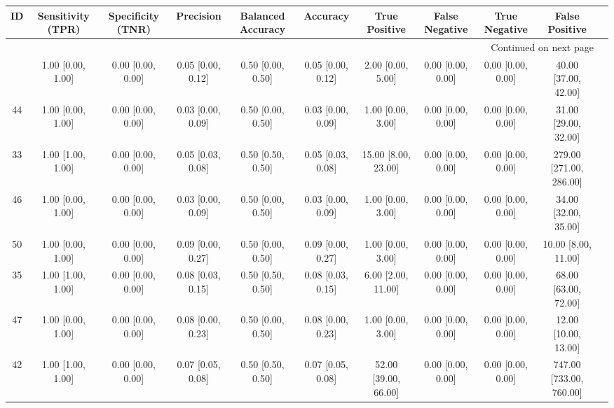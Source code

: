 \documentclass[8pt]{article}
\begin{document}
\begin{center}
\begin{footnotesize}
\begin{longtable}{|ccccccccccc|}
\toprule
 ID &  Sensitivity (TPR) &  Specificity (TNR) &          Precision &  Balanced Accuracy &           Accuracy &         True Positive &        False Negative &            True Negative &           False Positive \\
\midrule
\endhead
\midrule
\multicolumn{10}{r}{{Continued on next page}} \\
\midrule
\endfoot

\bottomrule
\endlastfoot
 45 &  1.00 [0.00, 1.00] &  0.00 [0.00, 0.00] &  0.05 [0.00, 0.12] &  0.50 [0.00, 0.50] &  0.05 [0.00, 0.12] &     2.00 [0.00, 5.00] &     0.00 [0.00, 0.00] &        0.00 [0.00, 0.00] &     40.00 [37.00, 42.00] \\
 44 &  1.00 [0.00, 1.00] &  0.00 [0.00, 0.00] &  0.03 [0.00, 0.09] &  0.50 [0.00, 0.50] &  0.03 [0.00, 0.09] &     1.00 [0.00, 3.00] &     0.00 [0.00, 0.00] &        0.00 [0.00, 0.00] &     31.00 [29.00, 32.00] \\
 33 &  1.00 [1.00, 1.00] &  0.00 [0.00, 0.00] &  0.05 [0.03, 0.08] &  0.50 [0.50, 0.50] &  0.05 [0.03, 0.08] &   15.00 [8.00, 23.00] &     0.00 [0.00, 0.00] &        0.00 [0.00, 0.00] &  279.00 [271.00, 286.00] \\
 46 &  1.00 [0.00, 1.00] &  0.00 [0.00, 0.00] &  0.03 [0.00, 0.09] &  0.50 [0.00, 0.50] &  0.03 [0.00, 0.09] &     1.00 [0.00, 3.00] &     0.00 [0.00, 0.00] &        0.00 [0.00, 0.00] &     34.00 [32.00, 35.00] \\
 50 &  1.00 [0.00, 1.00] &  0.00 [0.00, 0.00] &  0.09 [0.00, 0.27] &  0.50 [0.00, 0.50] &  0.09 [0.00, 0.27] &     1.00 [0.00, 3.00] &     0.00 [0.00, 0.00] &        0.00 [0.00, 0.00] &      10.00 [8.00, 11.00] \\
 35 &  1.00 [1.00, 1.00] &  0.00 [0.00, 0.00] &  0.08 [0.03, 0.15] &  0.50 [0.50, 0.50] &  0.08 [0.03, 0.15] &    6.00 [2.00, 11.00] &     0.00 [0.00, 0.00] &        0.00 [0.00, 0.00] &     68.00 [63.00, 72.00] \\
 47 &  1.00 [0.00, 1.00] &  0.00 [0.00, 0.00] &  0.08 [0.00, 0.23] &  0.50 [0.00, 0.50] &  0.08 [0.00, 0.23] &     1.00 [0.00, 3.00] &     0.00 [0.00, 0.00] &        0.00 [0.00, 0.00] &     12.00 [10.00, 13.00] \\
 42 &  1.00 [1.00, 1.00] &  0.00 [0.00, 0.00] &  0.07 [0.05, 0.08] &  0.50 [0.50, 0.50] &  0.07 [0.05, 0.08] &  52.00 [39.00, 66.00] &     0.00 [0.00, 0.00] &        0.00 [0.00, 0.00] &  747.00 [733.00, 760.00] \\

\end{longtable}
\end{footnotesize}
\end{center}
\end{document}
